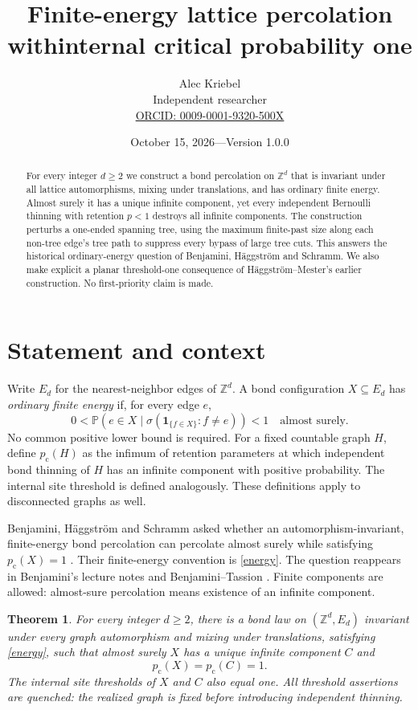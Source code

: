 \documentclass[11pt]{article}
\title{Finite-energy lattice percolation with\break internal critical probability one}
\author{Alec Kriebel\\\small Independent researcher\\
\small\href{https://orcid.org/0009-0001-9320-500X}{ORCID: 0009-0001-9320-500X}}
\date{October 15, 2026\quad---\quad Version 1.0.0}
\newtheorem{theorem}{Theorem}
\newcommand{\Z}{\mathbb Z}
\newcommand{\Pp}{\mathbb P}
\newcommand{\pc}{p_{\mathrm c}}
\begin{document}
\maketitle
\begin{abstract}
For every integer $d\ge2$ we construct a bond percolation on $\Z^d$ that is invariant under all lattice automorphisms, mixing under translations, and has ordinary finite energy. Almost surely it has a unique infinite component, yet every independent Bernoulli thinning with retention $p<1$ destroys all infinite components. The construction perturbs a one-ended spanning tree, using the maximum finite-past size along each non-tree edge's tree path to suppress every bypass of large tree cuts. This answers the historical ordinary-energy question of Benjamini, H\"aggstr\"om and Schramm. We also make explicit a planar threshold-one consequence of H\"aggstr\"om--Mester's earlier construction. No first-priority claim is made.
\end{abstract}

\section{Statement and context}
Write $E_d$ for the nearest-neighbor edges of $\Z^d$. A bond configuration $X\subseteq E_d$ has \emph{ordinary finite energy} if, for every edge $e$,
\begin{equation}\label{energy}
 0<\Pp(e\in X\mid\sigma(\mathbf1_{\{f\in X\}}:f\ne e))<1
 \quad\text{almost surely}.
\end{equation}
No common positive lower bound is required. For a fixed countable graph $H$, define $\pc(H)$ as the infimum of retention parameters at which independent bond thinning of $H$ has an infinite component with positive probability. The internal site threshold is defined analogously. These definitions apply to disconnected graphs as well.

Benjamini, H\"aggstr\"om and Schramm asked whether an automorphism-invariant, finite-energy bond percolation can percolate almost surely while satisfying $\pc(X)=1$ \cite[Question 1.1]{BHS}. Their finite-energy convention is \eqref{energy}. The question reappears in Benjamini's lecture notes \cite[Open problem 8.15, p.~61 of the notes version]{S} and Benjamini--Tassion \cite[Question 1]{BT}. Finite components are allowed: almost-sure percolation means existence of an infinite component.

\begin{theorem}\label{main}
For every integer $d\ge2$, there is a bond law on $(\Z^d,E_d)$ invariant under every graph automorphism and mixing under translations, satisfying \eqref{energy}, such that almost surely $X$ has a unique infinite component $C$ and
\[
 \pc(X)=\pc(C)=1.
\]
The internal site thresholds of $X$ and $C$ also equal one. All threshold assertions are quenched: the realized graph is fixed before introducing independent thinning.
\end{theorem}
\end{document}
